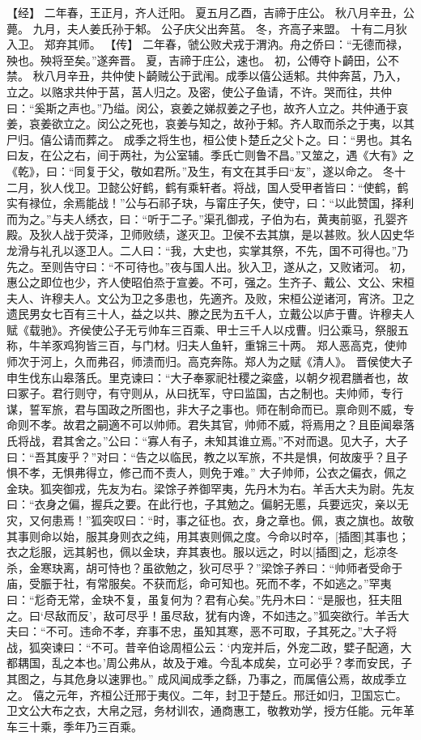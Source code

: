 \documentclass[a4paper,12pt,UTF8,twoside]{ctexbook}
\begin{document}
【经】
二年春，王正月，齐人迁阳。
夏五月乙酉，吉禘于庄公。
秋八月辛丑，公薨。
九月，夫人姜氏孙于邾。
公子庆父出奔莒。
冬，齐高子来盟。
十有二月狄入卫。
郑弃其师。
【传】
二年春，虢公败犬戎于渭汭。舟之侨曰：“无德而禄，殃也。殃将至矣。”遂奔晋。
夏，吉禘于庄公，速也。
初，公傅夺卜齮田，公不禁。
秋八月辛丑，共仲使卜齮贼公于武闱。成季以僖公适邾。共仲奔莒，乃入，立之。以赂求共仲于莒，莒人归之。及密，使公子鱼请，不许。哭而往，共仲曰：“奚斯之声也。”乃缢。闵公，哀姜之娣叔姜之子也，故齐人立之。共仲通于哀姜，哀姜欲立之。闵公之死也，哀姜与知之，故孙于邾。齐人取而杀之于夷，以其尸归。僖公请而葬之。
成季之将生也，桓公使卜楚丘之父卜之。曰：“男也。其名曰友，在公之右，间于两社，为公室辅。季氏亡则鲁不昌。”又筮之，遇《大有》之《乾》，曰：“同复于父，敬如君所。”及生，有文在其手曰“友”，遂以命之。
冬十二月，狄人伐卫。卫懿公好鹤，鹤有乘轩者。将战，国人受甲者皆曰：“使鹤，鹤实有禄位，余焉能战！”公与石祁子玦，与甯庄子矢，使守，曰：“以此赞国，择利而为之。”与夫人绣衣，曰：“听于二子。”渠孔御戎，子伯为右，黄夷前驱，孔婴齐殿。及狄人战于荧泽，卫师败绩，遂灭卫。卫侯不去其旗，是以甚败。狄人囚史华龙滑与礼孔以逐卫人。二人曰：“我，大史也，实掌其祭，不先，国不可得也。”乃先之。至则告守曰：“不可待也。”夜与国人出。狄入卫，遂从之，又败诸河。
初，惠公之即位也少，齐人使昭伯烝于宣姜。不可，强之。生齐子、戴公、文公、宋桓夫人、许穆夫人。文公为卫之多患也，先適齐。及败，宋桓公逆诸河，宵济。卫之遗民男女七百有三十人，益之以共、滕之民为五千人，立戴公以庐于曹。许穆夫人赋《载驰》。齐侯使公子无亏帅车三百乘、甲士三千人以戍曹。归公乘马，祭服五称，牛羊豕鸡狗皆三百，与门材。归夫人鱼轩，重锦三十两。
郑人恶高克，使帅师次于河上，久而弗召，师溃而归。高克奔陈。郑人为之赋《清人》。
晋侯使大子申生伐东山皋落氏。里克谏曰：“大子奉冢祀社稷之粢盛，以朝夕视君膳者也，故曰冢子。君行则守，有守则从，从曰抚军，守曰监国，古之制也。夫帅师，专行谋，誓军旅，君与国政之所图也，非大子之事也。师在制命而已。禀命则不威，专命则不孝。故君之嗣適不可以帅师。君失其官，帅师不威，将焉用之？且臣闻皋落氏将战，君其舍之。”公曰：“寡人有子，未知其谁立焉。”不对而退。见大子，大子曰：“吾其废乎？”对曰：“告之以临民，教之以军旅，不共是惧，何故废乎？且子惧不孝，无惧弗得立，修己而不责人，则免于难。”
大子帅师，公衣之偏衣，佩之金玦。狐突御戎，先友为右。梁馀子养御罕夷，先丹木为右。羊舌大夫为尉。先友曰：“衣身之偏，握兵之要。在此行也，子其勉之。偏躬无慝，兵要远灾，亲以无灾，又何患焉！”狐突叹曰：“时，事之征也。衣，身之章也。佩，衷之旗也。故敬其事则命以始，服其身则衣之纯，用其衷则佩之度。今命以时卒，[插图]其事也；衣之尨服，远其躬也，佩以金玦，弃其衷也。服以远之，时以[插图]之，尨凉冬杀，金寒玦离，胡可恃也？虽欲勉之，狄可尽乎？”梁馀子养曰：“帅师者受命于庙，受脤于社，有常服矣。不获而尨，命可知也。死而不孝，不如逃之。”罕夷曰：“尨奇无常，金玦不复，虽复何为？君有心矣。”先丹木曰：“是服也，狂夫阻之。曰‘尽敌而反’，敌可尽乎！虽尽敌，犹有内谗，不如违之。”狐突欲行。羊舌大夫曰：“不可。违命不孝，弃事不忠，虽知其寒，恶不可取，子其死之。”大子将战，狐突谏曰：“不可。昔辛伯谂周桓公云：‘内宠并后，外宠二政，嬖子配適，大都耦国，乱之本也。’周公弗从，故及于难。今乱本成矣，立可必乎？孝而安民，子其图之，与其危身以速罪也。”
成风闻成季之繇，乃事之，而属僖公焉，故成季立之。
僖之元年，齐桓公迁邢于夷仪。二年，封卫于楚丘。邢迁如归，卫国忘亡。
卫文公大布之衣，大帛之冠，务材训农，通商惠工，敬教劝学，授方任能。元年革车三十乘，季年乃三百乘。
\end{document}
